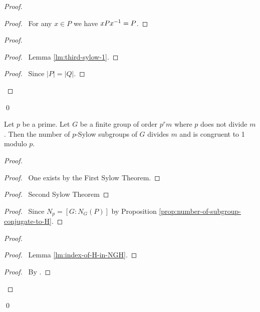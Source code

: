 \begin{proof}
\pf
{}
\begin{proof}
	\pf\ For any $x \in P$ we have $xP{x}^{-1} = P$.
\end{proof}
\begin{proof}
	\begin{proof}
		\pf\ Lemma \ref{lm:third-sylow-1}.
	\end{proof}
	\begin{proof}
		\pf\ Since $|P| = |Q|$.
	\end{proof}
\end{proof}
\qed
\end{proof}

\begin{thm}
Let $p$ be a prime. Let $G$ be a finite group of order $p^rm$ where $p$ does not divide $m$. Then the number of $p$-Sylow subgroups of $G$ divides $m$ and is congruent to 1 modulo $p$.
\end{thm}

\begin{proof}
\pf
{}
\begin{proof}
	\pf\ One exists by the First Sylow Theorem.
\end{proof}
\begin{proof}
	\pf\ Second Sylow Theorem
\end{proof}
\begin{proof}
	\pf\ Since $N_p = [G : N_G(P)]$ by Proposition \ref{prop:number-of-subgroup-conjugate-to-H}.
\end{proof}
\begin{proof}
	\begin{proof}
		\pf\ Lemma \ref{lm:index-of-H-in-NGH}.
	\end{proof}
	\begin{proof}
		\pf\ By .
	\end{proof}
\end{proof}
\qed
\end{proof}

